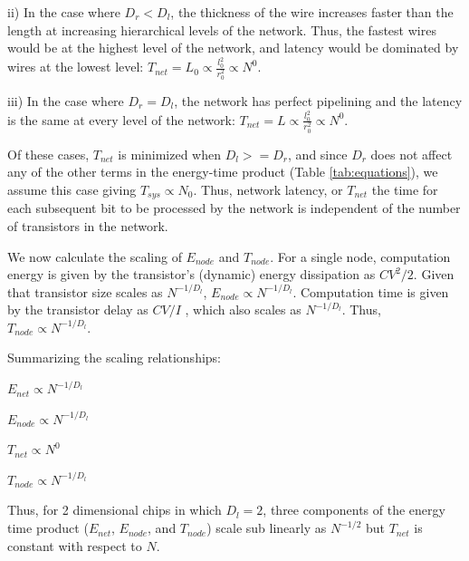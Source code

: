 \documentclass[12pt]{article}
\begin{document}
ii) In the case where $D_r < D_l$, the thickness of the wire increases faster than the length at increasing
hierarchical levels of the network.  Thus, the fastest wires would be at the highest level
of the network, and latency would be dominated by wires at the lowest level: $T_{net} = L_0 \propto \frac{l_0^2}{r_0^2} \propto N^0$.  

iii) In the case where $D_r = D_l$, the network has perfect pipelining and the latency
is the same at every level of the network: $T_{net} =L \propto \frac{l_0^2}{r_0^2} \propto N^0$.

Of these cases, $T_{net}$ is minimized when $D_l >= D_r$,  and since $D_r$ does not affect any of the other terms in the energy-time product (Table \ref{tab:equations}),  we assume this case giving $T_{sys} \propto N_0$.  Thus, network latency, or $T_{net}$ the time for each subsequent bit to be processed by the network is independent of the number of transistors in the network.



We now calculate the scaling of $E_{node}$ and $T_{node}$. For a single node, computation energy is given by the transistor's 
(dynamic) energy dissipation as $CV^2/2$.  Given that transistor size scales as $N^{-1/D_l}$,
$E_{node} \propto  N^{-1/D_l}$. %
Computation time is given by the 
transistor delay as $CV/I$ \cite{bakoglu90}, which also scales as $N^{-1/D_l}$.  %
Thus, $T_{node} \propto  N^{-1/D_l}$.  

Summarizing the scaling relationships: 

$E_{net} \propto N^{-1/D_l}$

$E_{node} \propto N^{-1/D_l}$

$T_{net} \propto N^0$

$T_{node} \propto N^{-1/D_l}$



Thus, for 2 dimensional chips in which $D_l = 2$, three components of the energy time product ($E_{net}$, $E_{node}$, and $T_{node}$) scale sub linearly as $N^{-1/2}$ but $T_{net}$ is constant with respect to $N$.
\end{document}
